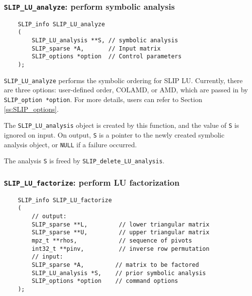\documentclass[12pt]{article}
\theoremstyle{definition}
\begin{document}
\cprotect\subsubsection{\verb|SLIP_LU_analyze|: perform symbolic analysis}
\label{s:SLIP_LU_analyze}

\begin{mdframed}[userdefinedwidth=6in]
{\footnotesize
\begin{verbatim}
    SLIP_info SLIP_LU_analyze
    (
        SLIP_LU_analysis **S, // symbolic analysis
        SLIP_sparse *A,       // Input matrix
        SLIP_options *option  // Control parameters
    );
\end{verbatim}
} \end{mdframed}

\verb|SLIP_LU_analyze| performs the symbolic ordering for SLIP LU. Currently,
there are three options: user-defined order, COLAMD, or AMD, which are passed
in by \verb|SLIP_option *option|. For more details, users can refer to Section
\ref{ss:SLIP_options}.

The \verb|SLIP_LU_analysis| object is created by this function, and the value
of \verb|S| is ignored on input.  On output, \verb|S| is a pointer to the newly
created symbolic analysis object, or \verb|NULL| if a failure occurred.

The analysis \verb|S| is freed by \verb|SLIP_delete_LU_analysis|.

\cprotect\subsubsection{\verb|SLIP_LU_factorize|: perform LU factorization}
\label{ss:SLIP_LU_factorize}

\begin{mdframed}[userdefinedwidth=6in]
{\footnotesize
\begin{verbatim}
    SLIP_info SLIP_LU_factorize
    (
        // output:
        SLIP_sparse **L,         // lower triangular matrix
        SLIP_sparse **U,         // upper triangular matrix
        mpz_t **rhos,            // sequence of pivots
        int32_t **pinv,          // inverse row permutation
        // input:
        SLIP_sparse *A,         // matrix to be factored
        SLIP_LU_analysis *S,    // prior symbolic analysis
        SLIP_options *option    // command options
    );
\end{verbatim}
} \end{mdframed}
\end{document}
